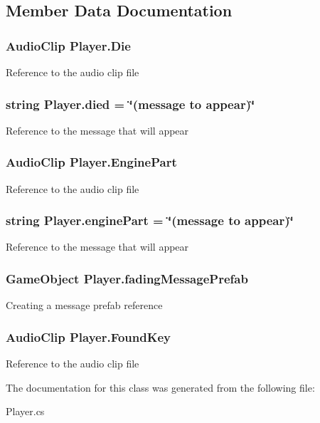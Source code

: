 \subsection{Member Data Documentation}
\hypertarget{class_player_a8e34fba594dbf68174d883d763d42ace}{
\subsubsection[{Die}]{\setlength{\rightskip}{0pt plus 5cm}Audio\-Clip Player.\-Die}}\label{class_player_a8e34fba594dbf68174d883d763d42ace}
Reference to the audio clip file \hypertarget{class_player_a998c3019f31ab3ad606453158abe9dcb}{
\subsubsection[{died}]{\setlength{\rightskip}{0pt plus 5cm}string Player.\-died = \char`\"{}(message to appear)\char`\"{}}}\label{class_player_a998c3019f31ab3ad606453158abe9dcb}
Reference to the message that will appear \hypertarget{class_player_afbe782b06cf141675680af069408cd6a}{
\subsubsection[{Engine\-Part}]{\setlength{\rightskip}{0pt plus 5cm}Audio\-Clip Player.\-Engine\-Part}}\label{class_player_afbe782b06cf141675680af069408cd6a}
Reference to the audio clip file \hypertarget{class_player_a66e422e9d0486bdb42c835142caa93c6}{
\subsubsection[{engine\-Part}]{\setlength{\rightskip}{0pt plus 5cm}string Player.\-engine\-Part = \char`\"{}(message to appear)\char`\"{}}}\label{class_player_a66e422e9d0486bdb42c835142caa93c6}
Reference to the message that will appear \hypertarget{class_player_a13d88e1c4562fddf90baf0d57afc68c5}{
\subsubsection[{fading\-Message\-Prefab}]{\setlength{\rightskip}{0pt plus 5cm}Game\-Object Player.\-fading\-Message\-Prefab}}\label{class_player_a13d88e1c4562fddf90baf0d57afc68c5}
Creating a message prefab reference \hypertarget{class_player_ae0ed5e4ea70a02e3f9c0ee8964c4fd64}{
\subsubsection[{Found\-Key}]{\setlength{\rightskip}{0pt plus 5cm}Audio\-Clip Player.\-Found\-Key}}\label{class_player_ae0ed5e4ea70a02e3f9c0ee8964c4fd64}
Reference to the audio clip file 

The documentation for this class was generated from the following file\-:\begin{DoxyCompactItemize}
\item 
Player.\-cs\end{DoxyCompactItemize}
